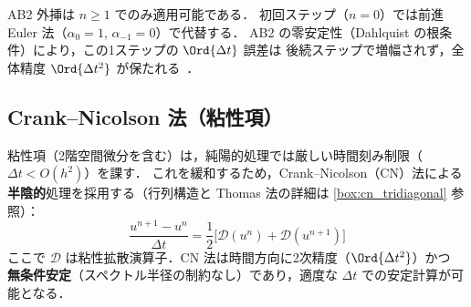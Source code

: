 \begin{tcolorbox}[warnbox, title={AB2 起動問題}]
\label{warn:ab2_startup}
AB2 外挿は $n \geq 1$ でのみ適用可能である．
初回ステップ（$n=0$）では前進 Euler 法（$\alpha_0=1,\,\alpha_{-1}=0$）で代替する．
AB2 の零安定性（Dahlquist の根条件）により，この1ステップの $\Ord{\Delta t}$ 誤差は
後続ステップで増幅されず，全体精度 $\Ord{\Delta t^2}$ が保たれる~\cite{DahlquistBjorck1974}．
\end{tcolorbox}

\subsection{Crank--Nicolson 法（粘性項）}

粘性項（2階空間微分を含む）は，純陽的処理では厳しい時間刻み制限（$\Delta t < O(h^2)$）を課す．
これを緩和するため，Crank--Nicolson（CN）法による\textbf{半陰的}処理を採用する（行列構造と Thomas 法の詳細は \ref{box:cn_tridiagonal} 参照）：
\begin{equation}
  \frac{u^{n+1} - u^n}{\Delta t} = \frac{1}{2}\bigl[\mathcal{D}(u^n) + \mathcal{D}(u^{n+1})\bigr]
  \label{eq:crank_nicolson}
\end{equation}
ここで $\mathcal{D}$ は粘性拡散演算子．CN 法は時間方向に2次精度（$\Ord{\Delta t^2}$）かつ
\textbf{無条件安定}（スペクトル半径の制約なし）であり，適度な $\Delta t$ での安定計算が可能となる．

